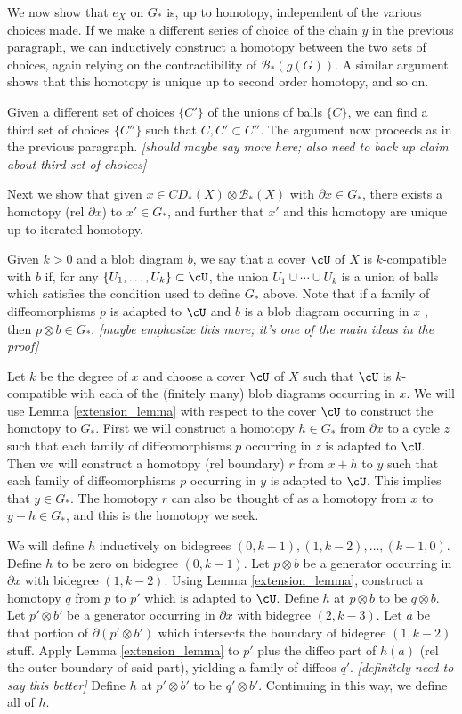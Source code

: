 \documentclass[11pt,leqno]{amsart}
\def\bc{{\mathcal B}}
\def\bd{\partial}
\def\sub{\subset}
\def\nn#1{{{\it \small [#1]}}}
\begin{document}
We now show that $e_X$ on $G_*$ is, up to homotopy, independent of the various choices made.
If we make a different series of choice of the chain $y$ in the previous paragraph,
we can inductively construct a homotopy between the two sets of choices,
again relying on the contractibility of $\bc_*(g(G))$.
A similar argument shows that this homotopy is unique up to second order homotopy, and so on.

Given a different set of choices $\{C'\}$ of the unions of balls $\{C\}$,
we can find a third set of choices $\{C''\}$ such that $C, C' \sub C''$.
The argument now proceeds as in the previous paragraph.
\nn{should maybe say more here; also need to back up claim about third set of choices}

Next we show that given $x \in CD_*(X) \otimes \bc_*(X)$ with $\bd x \in G_*$, there exists
a homotopy (rel $\bd x$) to $x' \in G_*$, and further that $x'$ and
this homotopy are unique up to iterated homotopy.

Given $k>0$ and a blob diagram $b$, we say that a cover $\cU$ of $X$ is $k$-compatible with
$b$ if, for any $\{U_1, \ldots, U_k\} \sub \cU$, the union
$U_1\cup\cdots\cup U_k$ is a union of balls which satisfies the condition used to define $G_*$ above.
Note that if a family of diffeomorphisms $p$ is adapted to
$\cU$ and $b$ is a blob diagram occurring in $x$ , then $p\otimes b \in G_*$.
\nn{maybe emphasize this more; it's one of the main ideas in the proof}

Let $k$ be the degree of $x$ and choose a cover $\cU$ of $X$ such that $\cU$ is
$k$-compatible with each of the (finitely many) blob diagrams occurring in $x$.
We will use Lemma \ref{extension_lemma} with respect to the cover $\cU$ to
construct the homotopy to $G_*$.
First we will construct a homotopy $h \in G_*$ from $\bd x$ to a cycle $z$ such that
each family of diffeomorphisms $p$ occurring in $z$ is adapted to $\cU$.
Then we will construct a homotopy (rel boundary) $r$ from $x + h$ to $y$ such that
each family of diffeomorphisms $p$ occurring in $y$ is adapted to $\cU$.
This implies that $y \in G_*$.
The homotopy $r$ can also be thought of as a homotopy from $x$ to $y-h \in G_*$, and this is the homotopy we seek.

We will define $h$ inductively on bidegrees $(0, k-1), (1, k-2), \ldots, (k-1, 0)$.
Define $h$ to be zero on bidegree $(0, k-1)$.
Let $p\otimes b$ be a generator occurring in $\bd x$ with bidegree $(1, k-2)$.
Using Lemma \ref{extension_lemma}, construct a homotopy $q$ from $p$ to $p'$ which is adapted to $\cU$.
Define $h$ at $p\otimes b$ to be $q\otimes b$.
Let $p'\otimes b'$ be a generator occurring in $\bd x$ with bidegree $(2, k-3)$.
Let $a$ be that portion of $\bd(p'\otimes b')$ which intersects the boundary of
bidegree $(1, k-2)$ stuff.
Apply Lemma \ref{extension_lemma} to $p'$ plus the diffeo part of $h(a)$
(rel the outer boundary of said part),
yielding a family of diffeos $q'$.
\nn{definitely need to say this better}
Define $h$ at $p'\otimes b'$ to be $q'\otimes b'$.
Continuing in this way, we define all of $h$.
\end{document}
